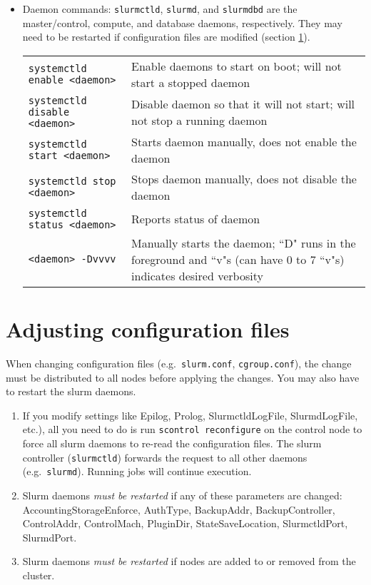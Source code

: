 \begin{itemize}
\item Daemon commands: \texttt{slurmctld}, \texttt{slurmd}, and \texttt{slurmdbd} are the master/control, compute, and database daemons, respectively. They may need to be restarted if configuration files are modified (section \ref{sec:slurmconfig}). \\
\begin{tabular}{l p{3.8in}}
\texttt{systemctld enable <daemon>} & Enable daemons to start on boot; will not start a stopped daemon \\
\texttt{systemctld disable <daemon>} & Disable daemon so that it will not start; will not stop a running daemon \\
\texttt{systemctld start <daemon>} & Starts daemon manually, does not enable the daemon \\
\texttt{systemctld stop <daemon>} & Stops daemon manually, does not disable the daemon \\
\texttt{systemctld status <daemon>} & Reports status of daemon \\
\texttt{<daemon> -Dvvvv} & Manually starts the daemon; ``D" runs in the foreground and ``v"s (can have 0 to 7 ``v"s) indicates desired verbosity \\
\end{tabular}

\end{itemize}

\section{Adjusting configuration files} \label{sec:slurmconfig}

When changing configuration files (e.g.\ \texttt{slurm.conf}, \texttt{cgroup.conf}), the change must be distributed to all nodes before applying the changes. You may also have to restart the slurm daemons.

\begin{enumerate}
\item If you modify settings like Epilog, Prolog, SlurmctldLogFile, SlurmdLogFile, etc.), all you need to do is run \texttt{scontrol reconfigure} on the control node to force all slurm daemons to re-read the configuration files. The slurm controller (\texttt{slurmctld}) forwards the request to all other daemons (e.g.\ \texttt{slurmd}). Running jobs will continue execution. 
\item Slurm daemons \emph{must be restarted} if any of these parameters are changed: AccountingStorageEnforce, AuthType, BackupAddr, BackupController, ControlAddr, ControlMach, PluginDir, StateSaveLocation, SlurmctldPort, SlurmdPort.
\item Slurm daemons \emph{must be restarted} if nodes are added to or removed from the cluster.
\end{enumerate}

